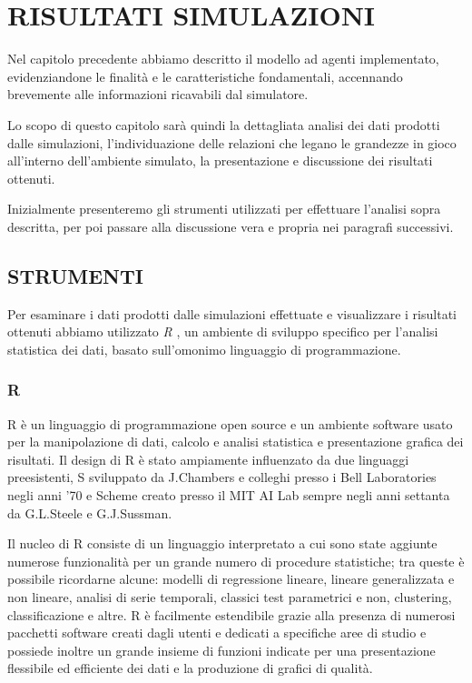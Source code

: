 \documentclass[12pt,a4paper,openright,twoside]{report}
\begin{document}
\chapter{RISULTATI SIMULAZIONI}

Nel capitolo precedente abbiamo descritto il modello ad agenti implementato, evidenziandone le finalità e le caratteristiche fondamentali, accennando brevemente alle informazioni ricavabili dal simulatore.

Lo scopo di questo capitolo sarà quindi la dettagliata analisi dei dati prodotti dalle simulazioni, l'individuazione delle relazioni che legano le grandezze in gioco all'interno dell'ambiente simulato, la presentazione e discussione dei risultati ottenuti.

Inizialmente presenteremo gli strumenti utilizzati per effettuare l'analisi sopra descritta, per poi passare alla discussione vera e propria nei paragrafi successivi.

\section{STRUMENTI}
Per esaminare i dati prodotti dalle simulazioni effettuate e visualizzare i risultati ottenuti abbiamo utilizzato \emph{R} \cite{Rlanguage}, un ambiente di sviluppo specifico per l'analisi statistica dei dati, basato sull'omonimo linguaggio di programmazione.

\subsection{R}

R è un linguaggio di programmazione open source e un ambiente software usato per la manipolazione di dati, calcolo e analisi statistica e presentazione grafica dei risultati. Il design di R è stato ampiamente influenzato da due linguaggi preesistenti, S sviluppato da J.Chambers e colleghi presso i Bell Laboratories negli anni '70 e Scheme creato presso il MIT AI Lab sempre negli anni settanta da G.L.Steele e G.J.Sussman. 

Il nucleo di R consiste di un linguaggio interpretato a cui sono state aggiunte numerose funzionalità per un grande numero di procedure statistiche;  tra queste è possibile ricordarne alcune: modelli di regressione lineare, lineare generalizzata e non lineare, analisi di serie temporali, classici test parametrici e non, clustering, classificazione e altre. R è facilmente estendibile grazie alla presenza di numerosi pacchetti software creati dagli utenti e dedicati a specifiche aree di studio e possiede inoltre un grande insieme di funzioni indicate per una presentazione flessibile ed efficiente dei dati e la produzione di grafici di qualità.
\end{document}
